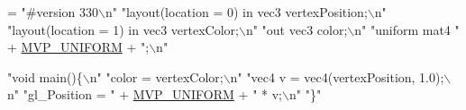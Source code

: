 \begin{DoxyCode}
= \textcolor{stringliteral}{"#version 330\(\backslash\)n"}
        \textcolor{stringliteral}{"layout(location = 0) in vec3 vertexPosition;\(\backslash\)n"}
        \textcolor{stringliteral}{"layout(location = 1) in vec3 vertexColor;\(\backslash\)n"}
        \textcolor{stringliteral}{"out vec3 color;\(\backslash\)n"}
        \textcolor{stringliteral}{"uniform mat4 "} + \hyperlink{namespaceburn_a6e76b4eddd0b0e54b5969cde910d0bc0}{MVP\_UNIFORM} + \textcolor{stringliteral}{";\(\backslash\)n"}

        \textcolor{stringliteral}{"void main()\{\(\backslash\)n"}
        \textcolor{stringliteral}{"color = vertexColor;\(\backslash\)n"}
        \textcolor{stringliteral}{"vec4 v = vec4(vertexPosition, 1.0);\(\backslash\)n"}
        \textcolor{stringliteral}{"gl\_Position = "} + \hyperlink{namespaceburn_a6e76b4eddd0b0e54b5969cde910d0bc0}{MVP\_UNIFORM} + \textcolor{stringliteral}{" * v;\(\backslash\)n"}
        \textcolor{stringliteral}{"\}"}
\end{DoxyCode}

